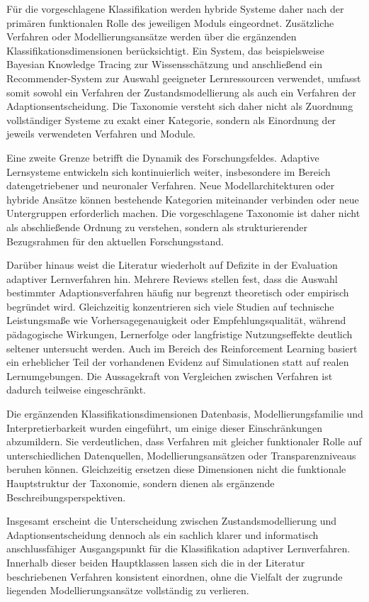 Für die vorgeschlagene Klassifikation werden hybride Systeme daher nach
der primären funktionalen Rolle des jeweiligen Moduls eingeordnet.
Zusätzliche Verfahren oder Modellierungsansätze werden über die
ergänzenden Klassifikationsdimensionen berücksichtigt. Ein System, das
beispielsweise Bayesian Knowledge Tracing zur Wissensschätzung und
anschließend ein Recommender-System zur Auswahl geeigneter
Lernressourcen verwendet, umfasst somit sowohl ein Verfahren der
Zustandsmodellierung als auch ein Verfahren der Adaptionsentscheidung.
Die Taxonomie versteht sich daher nicht als Zuordnung vollständiger
Systeme zu exakt einer Kategorie, sondern als Einordnung der jeweils
verwendeten Verfahren und Module.

Eine zweite Grenze betrifft die Dynamik des Forschungsfeldes. Adaptive
Lernsysteme entwickeln sich kontinuierlich weiter, insbesondere im
Bereich datengetriebener und neuronaler Verfahren. Neue
Modellarchitekturen oder hybride Ansätze können bestehende Kategorien
miteinander verbinden oder neue Untergruppen erforderlich machen. Die
vorgeschlagene Taxonomie ist daher nicht als abschließende Ordnung zu
verstehen, sondern als strukturierender Bezugsrahmen für den aktuellen
Forschungsstand.

Darüber hinaus weist die Literatur wiederholt auf Defizite in der
Evaluation adaptiver Lernverfahren hin. Mehrere Reviews stellen fest,
dass die Auswahl bestimmter Adaptionsverfahren häufig nur begrenzt
theoretisch oder empirisch begründet wird. Gleichzeitig konzentrieren
sich viele Studien auf technische Leistungsmaße wie
Vorhersagegenauigkeit oder Empfehlungsqualität, während pädagogische
Wirkungen, Lernerfolge oder langfristige Nutzungseffekte deutlich
seltener untersucht werden. Auch im Bereich des Reinforcement Learning
basiert ein erheblicher Teil der vorhandenen Evidenz auf Simulationen
statt auf realen Lernumgebungen. Die Aussagekraft von Vergleichen
zwischen Verfahren ist dadurch teilweise eingeschränkt.

Die ergänzenden Klassifikationsdimensionen Datenbasis,
Modellierungsfamilie und Interpretierbarkeit wurden eingeführt, um
einige dieser Einschränkungen abzumildern. Sie verdeutlichen, dass
Verfahren mit gleicher funktionaler Rolle auf unterschiedlichen
Datenquellen, Modellierungsansätzen oder Transparenzniveaus beruhen
können. Gleichzeitig ersetzen diese Dimensionen nicht die funktionale
Hauptstruktur der Taxonomie, sondern dienen als ergänzende
Beschreibungsperspektiven.

Insgesamt erscheint die Unterscheidung zwischen Zustandsmodellierung und
Adaptionsentscheidung dennoch als ein sachlich klarer und informatisch
anschlussfähiger Ausgangspunkt für die Klassifikation adaptiver
Lernverfahren. Innerhalb dieser beiden Hauptklassen lassen sich die in
der Literatur beschriebenen Verfahren konsistent einordnen, ohne die
Vielfalt der zugrunde liegenden Modellierungsansätze vollständig zu
verlieren.

